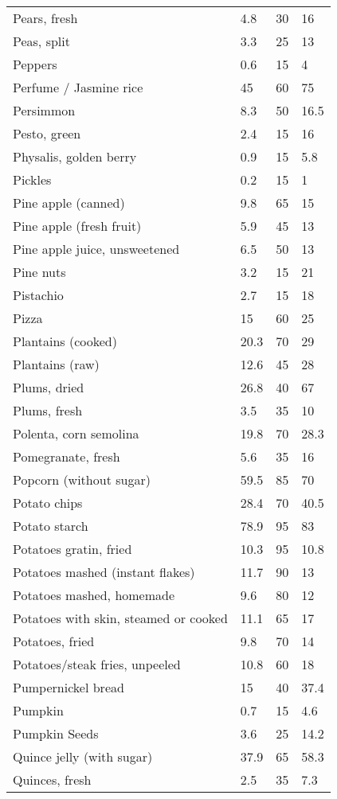 \documentclass[../main.tex]{subfiles}
\begin{document}
\begin{longtable}{llll}
Pears, fresh & 4.8 & 30 & 16 \\
Peas, split & 3.3 & 25 & 13 \\
Peppers & 0.6 & 15 & 4 \\
Perfume / Jasmine rice & 45 & 60 & 75 \\
Persimmon & 8.3 & 50 & 16.5 \\
Pesto, green & 2.4 & 15 & 16 \\
Physalis, golden berry & 0.9 & 15 & 5.8 \\
Pickles & 0.2 & 15 & 1 \\
Pine apple (canned) & 9.8 & 65 & 15 \\
Pine apple (fresh fruit) & 5.9 & 45 & 13 \\
Pine apple juice, unsweetened & 6.5 & 50 & 13 \\
Pine nuts & 3.2 & 15 & 21 \\
Pistachio & 2.7 & 15 & 18 \\
Pizza & 15 & 60 & 25 \\
Plantains (cooked) & 20.3 & 70 & 29 \\
Plantains (raw) & 12.6 & 45 & 28 \\
Plums, dried & 26.8 & 40 & 67 \\
Plums, fresh & 3.5 & 35 & 10 \\
Polenta, corn semolina & 19.8 & 70 & 28.3 \\
Pomegranate, fresh & 5.6 & 35 & 16 \\
Popcorn (without sugar) & 59.5 & 85 & 70 \\
Potato chips & 28.4 & 70 & 40.5 \\
Potato starch & 78.9 & 95 & 83 \\
Potatoes gratin, fried & 10.3 & 95 & 10.8 \\
Potatoes mashed (instant flakes) & 11.7 & 90 & 13 \\
Potatoes mashed, homemade & 9.6 & 80 & 12 \\
Potatoes with skin, steamed or cooked & 11.1 & 65 & 17 \\
Potatoes, fried & 9.8 & 70 & 14 \\
Potatoes/steak fries, unpeeled & 10.8 & 60 & 18 \\
Pumpernickel bread & 15 & 40 & 37.4 \\
Pumpkin & 0.7 & 15 & 4.6 \\
Pumpkin Seeds & 3.6 & 25 & 14.2 \\
Quince jelly (with sugar) & 37.9 & 65 & 58.3 \\
Quinces, fresh & 2.5 & 35 & 7.3 \\

\end{longtable}
\end{document}
